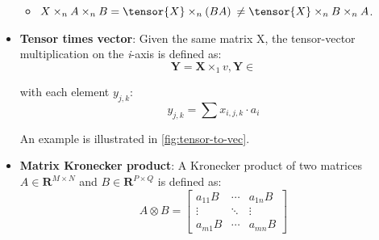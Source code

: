 \begin{itemize}
\begin{itemize}
                \item  $X \times_{n} A \times_{n} B = \tensor{X} \times_{n} (BA)$ $\neq \tensor{X} \times_{n} B \times_{n} A$.
            \end{itemize}

    
    \item \textbf{Tensor times vector}: 
       Given the same matrix X, the tensor-vector multiplication on the \textit{i}-axis is defined as:
       \begin{equation}
           \textbf{Y} = \textbf{X} \times_1 v, \textbf{Y} \in \mathbb{}
       \end{equation}

        with each element $y_{j,k}$: 
        \begin{equation}
            y_{j,k} = \sum x_{i,j,k} \cdot a_i
       \end{equation}
       
       An example is illustrated in \ref{fig:tensor-to-vec}.
        
    \item \textbf{Matrix Kronecker product}: 
       A Kronecker product of two matrices $A \in \mathbf{R}^{M \times N}$ and $B \in \mathbf{R}^{P \times Q}$
       is defined as: 
        \begin{equation} 
        A\otimes B = \begin{bmatrix} a_{11} B & \cdots & a_{1n}B \\ \vdots & \ddots & \vdots \\ a_{m1} B & \cdots & a_{mn} B \end{bmatrix}
        \end{equation}
        

\end{itemize}
